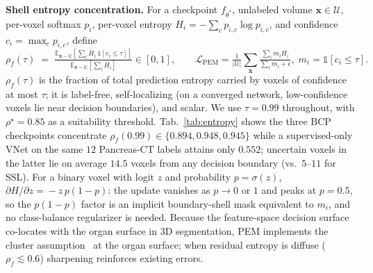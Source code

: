 \documentclass{midl}
\begin{document}
\noindent\textbf{Shell entropy concentration.}
For a checkpoint $f_{\theta^*}$, unlabeled volume $\mathbf{x}\in\mathcal{U}$, per-voxel softmax $p_i$, per-voxel entropy $H_i=-\sum_c p_{i,c}\log p_{i,c}$, and confidence $c_i=\max_c p_{i,c}$, define
\begin{equation}
    \rho_f(\tau) \;=\; \tfrac{\mathbb{E}_{\mathbf{x}\sim\mathcal{U}}[\sum_{i} H_i\,\mathbb{1}[c_i\le\tau]]}{\mathbb{E}_{\mathbf{x}\sim\mathcal{U}}[\sum_{i} H_i]} \in [0,1],
    \qquad
    \mathcal{L}_{\text{PEM}} = \tfrac{1}{|\mathcal{U}|}\!\sum_{\mathbf{x}}\tfrac{\sum_{i} m_i H_i}{\sum_i m_i+\epsilon},\; m_i=\mathbb{1}[c_i\!\le\!\tau].
    \label{eq:rho}
\end{equation}
$\rho_f(\tau)$ is the fraction of total prediction entropy carried by voxels of confidence at most $\tau$; it is label-free, self-localizing (on a converged network, low-confidence voxels lie near decision boundaries), and scalar. We use $\tau\!=\!0.99$ throughout, with $\rho^\star\!=\!0.85$ as a suitability threshold.
Tab.~\ref{tab:entropy} shows the three BCP checkpoints concentrate $\rho_f(0.99)\!\in\!\{0.894,0.948,0.945\}$ while a supervised-only VNet on the same $12$ Pancreas-CT labels attains only $0.552$; uncertain voxels in the latter lie on average $14.5$ voxels from any decision boundary (vs.\ $5$--$11$ for SSL).
For a binary voxel with logit $z$ and probability $p\!=\!\sigma(z)$, $\partial H/\partial z\!=\!-z\,p(1\!-\!p)$: the update vanishes as $p\!\to\!0$ or $1$ and peaks at $p\!=\!0.5$, so the $p(1\!-\!p)$ factor is an implicit boundary-shell mask equivalent to $m_i$, and no class-balance regularizer is needed. Because the feature-space decision surface co-locates with the organ surface in 3D segmentation, PEM implements the cluster assumption~\cite{chapelle2009semi,grandvalet2004entropy} at the organ surface; when residual entropy is diffuse ($\rho_f\!\lesssim\!0.6$) sharpening reinforces existing errors.
\end{document}
